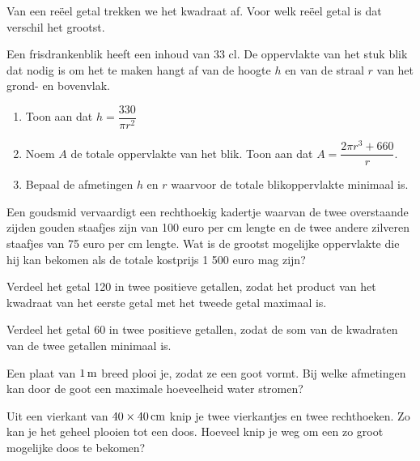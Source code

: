 \documentclass[a4paper,12pt,twoside]{article}
\begin{document}
\begin{oefening}
  Van een reëel getal trekken we het kwadraat af. Voor welk reëel getal is dat verschil het grootst.
\end{oefening}

\begin{oefening}
  Een frisdrankenblik heeft een inhoud van 33 cl. De oppervlakte van het stuk blik dat nodig is om het te maken hangt af van de hoogte $h$ en van de straal $r$ van het grond- en
  bovenvlak.
  \begin{enumerate}
  \item Toon aan dat $h=\dfrac{330}{\pi r^2}$
  \item Noem $A$ de totale oppervlakte van het blik. Toon aan dat $A=\dfrac{2\pi r^3 + 660}{r}$.
  \item Bepaal de afmetingen $h$ en $r$ waarvoor de totale blikoppervlakte minimaal is.
  \end{enumerate}
\end{oefening}

\begin{oefening}
  Een goudsmid vervaardigt een rechthoekig kadertje waarvan de twee overstaande zijden gouden staafjes zijn van 100 euro per cm lengte en de twee andere zilveren staafjes van 75 euro per cm lengte. Wat is de grootst mogelijke oppervlakte die hij kan bekomen als de totale kostprijs 1 500 euro mag zijn?
\end{oefening}

\begin{oefening}
  Verdeel het getal 120 in twee positieve getallen, zodat het product van het kwadraat van het eerste getal met het tweede getal maximaal is.
\end{oefening}

\begin{oefening}
  Verdeel het getal 60 in twee positieve getallen, zodat de som van de kwadraten van de twee getallen minimaal is.
\end{oefening}

\begin{oefening}
  Een plaat van $1 \m$ breed plooi je, zodat ze een goot vormt. Bij welke afmetingen kan door de goot een maximale hoeveelheid water stromen?
\end{oefening}

\begin{oefening}
  Uit een vierkant van $40 \times 40 \cm$ knip je twee vierkantjes en twee rechthoeken. Zo kan je het geheel plooien tot een doos. Hoeveel knip je weg om een zo groot mogelijke doos te bekomen?
\end{oefening}
\end{document}
